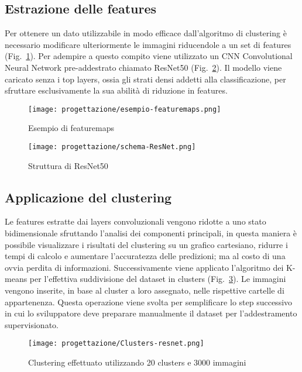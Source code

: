 \newpage


\subsection{Estrazione delle features}
Per ottenere un dato utilizzabile in modo efficace dall'algoritmo di clustering è necessario modificare ulteriormente le immagini riducendole a un set di features (Fig.~\ref{fig:featuremaps}).
Per adempire a questo compito viene utilizzato un CNN Convolutional Neural Network pre-addestrato chiamato ResNet50 (Fig.~\ref{fig:schema-resnet}).
Il modello viene caricato senza i top layers, ossia gli strati densi addetti alla classificazione, per sfruttare esclusivamente la sua abilità di riduzione in features.

\begin{figure}[!h] 
  \centering 
  \texttt{[image: progettazione/esempio-featuremaps.png]} 
  \caption{Esempio di featuremaps}
  \label{fig:featuremaps}
\end{figure}

\begin{figure}[!h] 
  \centering 
  \texttt{[image: progettazione/schema-ResNet.png]} 
  \caption{Struttura di ResNet50}
  \label{fig:schema-resnet}
\end{figure}



\subsection{Applicazione del clustering}
Le features estratte dai layers convoluzionali vengono ridotte a uno stato bidimensionale sfruttando l'analisi dei componenti principali, in questa maniera è possibile visualizzare i risultati del clustering su un grafico cartesiano, ridurre i tempi di calcolo e aumentare l'accuratezza delle predizioni; ma al costo di una ovvia perdita di informazioni.
Successivamente viene applicato l'algoritmo dei K-means per l'effettiva suddivisione del dataset in clusters (Fig.~\ref{fig:clusters-resnet}).
Le immagini vengono inserite, in base al cluster a loro assegnato, nelle rispettive cartelle di appartenenza.
Questa operazione viene svolta per semplificare lo step successivo in cui lo sviluppatore deve preparare manualmente il dataset per l'addestramento supervisionato.

\begin{figure}[!h] 
  \centering 
  \texttt{[image: progettazione/Clusters-resnet.png]} 
  \caption{Clustering effettuato utilizzando 20 clusters e 3000 immagini}
  \label{fig:clusters-resnet}
\end{figure}


